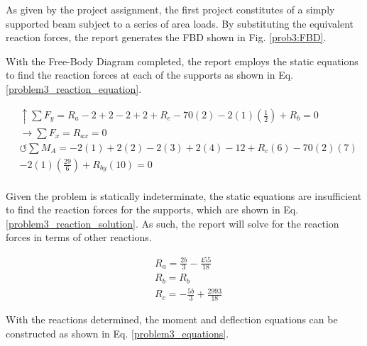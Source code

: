 \documentclass[a4paper]{article}
\begin{document}
As given by the project assignment, the first project constitutes of a simply supported beam subject to a series of area loads. By substituting the equivalent reaction forces, the report generates the FBD shown in Fig. \ref{prob3:FBD}.

With the Free-Body Diagram completed, the report employs the static equations to find the reaction forces at each of the supports as shown in Eq. \ref{problem3_reaction_equation}.

\begin{equation}
\begin{split}
	&\uparrow \sum F_y = R_a - 2 + 2 - 2 + 2 + R_c - 70(2) - 2(1)\left(\frac{1}{2}\right) + R_b = 0 \\
 	&\rightarrow \sum F_x = R_{ax} = 0 \\
 	&\circlearrowleft \sum M_A = -2(1) + 2(2) - 2(3) + 2(4) - 12 + R_c(6) - 70(2)(7) \\
	&  - 2(1)\left(\frac{29}{6}\right) + R_{by}(10) = 0 \\
\end{split}
\label{problem3_reaction_equation}
\end{equation}

Given the problem is statically indeterminate, the static equations are insufficient to find the reaction forces for the supports, which are shown in Eq. \ref{problem3_reaction_solution}. As such, the report will solve for the reaction forces in terms of other reactions.

\begin{equation}
\begin{split}
	& R_a = \frac{2b}{3} - \frac{455}{18} \\
	& R_b = R_b \\
	& R_c = -\frac{5b}{3} + \frac{2993}{18}
\end{split}
\label{problem3_reaction_solution}
\end{equation}

With the reactions determined, the moment and deflection equations can be constructed as shown in Eq. \ref{problem3_equations}.
\end{document}
